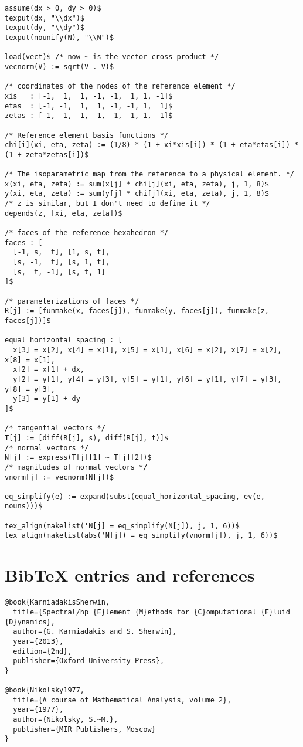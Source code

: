 \documentclass[11pt]{article}
\begin{document}
\begin{verbatim}
assume(dx > 0, dy > 0)$
texput(dx, "\\dx")$
texput(dy, "\\dy")$
texput(nounify(N), "\\N")$

load(vect)$ /* now ~ is the vector cross product */
vecnorm(V) := sqrt(V . V)$

/* coordinates of the nodes of the reference element */
xis   : [-1,  1,  1, -1, -1,  1, 1, -1]$
etas  : [-1, -1,  1,  1, -1, -1, 1,  1]$
zetas : [-1, -1, -1, -1,  1,  1, 1,  1]$

/* Reference element basis functions */
chi[i](xi, eta, zeta) := (1/8) * (1 + xi*xis[i]) * (1 + eta*etas[i]) * (1 + zeta*zetas[i])$

/* The isoparametric map from the reference to a physical element. */
x(xi, eta, zeta) := sum(x[j] * chi[j](xi, eta, zeta), j, 1, 8)$
y(xi, eta, zeta) := sum(y[j] * chi[j](xi, eta, zeta), j, 1, 8)$
/* z is similar, but I don't need to define it */
depends(z, [xi, eta, zeta])$

/* faces of the reference hexahedron */
faces : [
  [-1, s,  t], [1, s, t],
  [s, -1,  t], [s, 1, t],
  [s,  t, -1], [s, t, 1]
]$

/* parameterizations of faces */
R[j] := [funmake(x, faces[j]), funmake(y, faces[j]), funmake(z, faces[j])]$

equal_horizontal_spacing : [
  x[3] = x[2], x[4] = x[1], x[5] = x[1], x[6] = x[2], x[7] = x[2], x[8] = x[1],
  x[2] = x[1] + dx,
  y[2] = y[1], y[4] = y[3], y[5] = y[1], y[6] = y[1], y[7] = y[3], y[8] = y[3],
  y[3] = y[1] + dy
]$

/* tangential vectors */
T[j] := [diff(R[j], s), diff(R[j], t)]$
/* normal vectors */
N[j] := express(T[j][1] ~ T[j][2])$
/* magnitudes of normal vectors */
vnorm[j] := vecnorm(N[j])$

eq_simplify(e) := expand(subst(equal_horizontal_spacing, ev(e, nouns)))$

tex_align(makelist('N[j] = eq_simplify(N[j]), j, 1, 6))$
tex_align(makelist(abs('N[j]) = eq_simplify(vnorm[j]), j, 1, 6))$
\end{verbatim}

\section{BibTeX entries and references}
\label{sec-5}




\begin{verbatim}
@book{KarniadakisSherwin,
  title={Spectral/hp {E}lement {M}ethods for {C}omputational {F}luid {D}ynamics},
  author={G. Karniadakis and S. Sherwin},
  year={2013},
  edition={2nd},
  publisher={Oxford University Press},
}

@book{Nikolsky1977,
  title={A course of Mathematical Analysis, volume 2},
  year={1977},
  author={Nikolsky, S.~M.},
  publisher={MIR Publishers, Moscow}
}
\end{verbatim}
\end{document}
